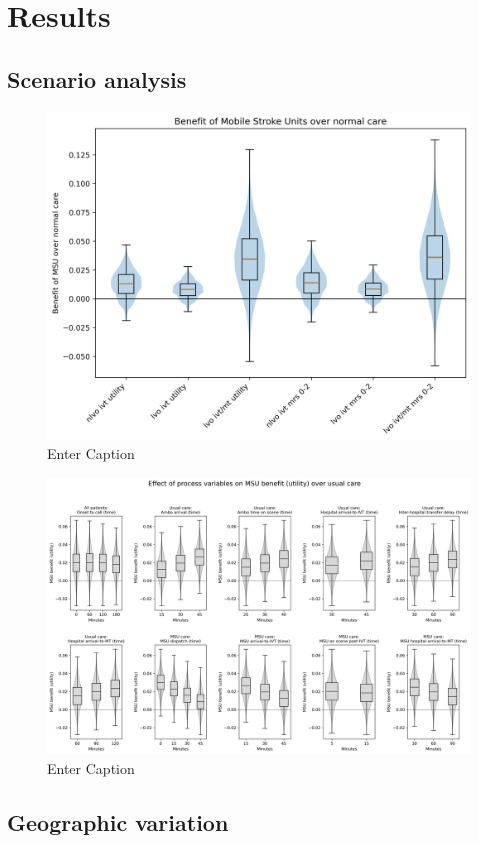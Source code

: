 \section{Results}

\subsection{Scenario analysis}



\begin{figure}
    \centering
    \includegraphics[width=0.6\linewidth]{images/scenario_results_summary.png}
    \caption{Enter Caption}
    \label{fig:enter-label}
\end{figure}


\begin{figure}
    \centering
    \includegraphics[width=1\linewidth]{images/msu_net_utility_benefit.png}
    \caption{Enter Caption}
    \label{fig:enter-label}
\end{figure}

\subsection{Geographic variation}


